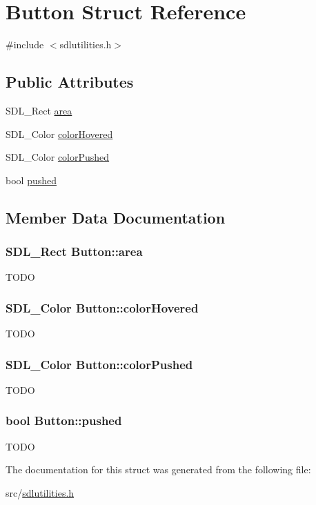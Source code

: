 \hypertarget{structButton}{
\section{Button Struct Reference}
\label{structButton}
}


{\ttfamily \#include $<$sdlutilities.h$>$}

\subsection*{Public Attributes}
\begin{DoxyCompactItemize}
\item 
SDL\_\-Rect \hyperlink{structButton_ae93a84a87d8149283290840bdf1793e7}{area}
\item 
SDL\_\-Color \hyperlink{structButton_a1cc1119609416a267b0b208d2527642b}{colorHovered}
\item 
SDL\_\-Color \hyperlink{structButton_a4d3cba461299daf2b1fa9a96233254da}{colorPushed}
\item 
bool \hyperlink{structButton_a661c0b067453424216eee9c3e74908da}{pushed}
\end{DoxyCompactItemize}


\subsection{Member Data Documentation}
\hypertarget{structButton_ae93a84a87d8149283290840bdf1793e7}{
\subsubsection[{area}]{\setlength{\rightskip}{0pt plus 5cm}SDL\_\-Rect {\bf Button::area}}}
\label{structButton_ae93a84a87d8149283290840bdf1793e7}
TODO \hypertarget{structButton_a1cc1119609416a267b0b208d2527642b}{
\subsubsection[{colorHovered}]{\setlength{\rightskip}{0pt plus 5cm}SDL\_\-Color {\bf Button::colorHovered}}}
\label{structButton_a1cc1119609416a267b0b208d2527642b}
TODO \hypertarget{structButton_a4d3cba461299daf2b1fa9a96233254da}{
\subsubsection[{colorPushed}]{\setlength{\rightskip}{0pt plus 5cm}SDL\_\-Color {\bf Button::colorPushed}}}
\label{structButton_a4d3cba461299daf2b1fa9a96233254da}
TODO \hypertarget{structButton_a661c0b067453424216eee9c3e74908da}{
\subsubsection[{pushed}]{\setlength{\rightskip}{0pt plus 5cm}bool {\bf Button::pushed}}}
\label{structButton_a661c0b067453424216eee9c3e74908da}
TODO 

The documentation for this struct was generated from the following file:\begin{DoxyCompactItemize}
\item 
src/\hyperlink{sdlutilities_8h}{sdlutilities.h}\end{DoxyCompactItemize}
